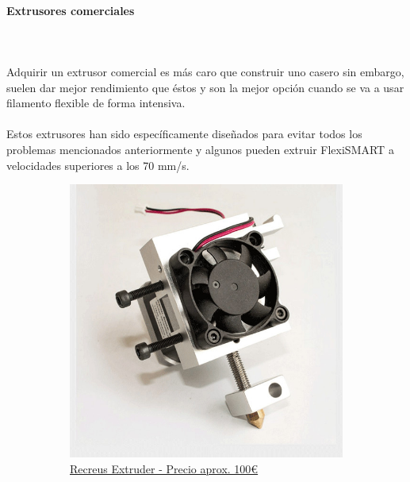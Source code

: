 \documentclass[11pt,a4paper]{article}
\begin{document}
			\paragraph{Extrusores comerciales}\mbox{}\\\\
Adquirir un extrusor comercial es más caro que construir uno casero sin embargo, suelen dar mejor rendimiento que éstos y son la mejor opción cuando se va a usar filamento flexible de forma intensiva.
\\\\
Estos extrusores han sido específicamente diseñados para evitar todos los problemas mencionados anteriormente y algunos pueden extruir FlexiSMART a velocidades superiores a los 70 mm/s.
\begin{figure}[H]
    \centering
    \begin{subfigure}[b]{0.4\textwidth}
        \includegraphics[width=\textwidth,cfbox=azul_marcos 4pt 0pt]{FOTOS/EXTRUSOR5}
		\caption*{\href{http://www.recreus.com}{{\footnotesize Recreus Extruder - Precio aprox. 100\euro}}}
    \end{subfigure}
    ~ \qquad%
    \begin{subfigure}[b]{0.4\textwidth}

\end{subfigure}
\end{figure}
\end{document}

